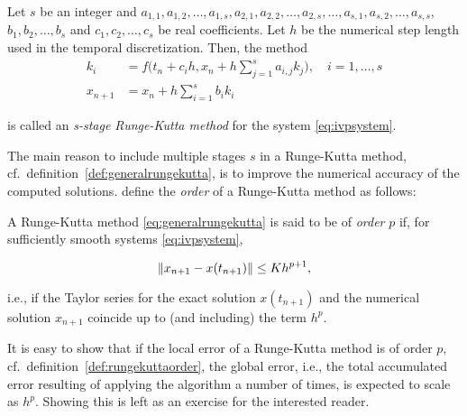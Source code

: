 \begin{Def}
    \label{def:generalrungekutta}
    Let $s$ be an integer and $a_{1,1},a_{1,2},\ldots,a_{1,s},a_{2,1},
    a_{2,2},\ldots,a_{2,s},\ldots,a_{s,1},a_{s,2},\ldots,a_{s,s}$,
    $b_{1},b_{2},\ldots,b_{s}$ and $c_{1},c_{2},\ldots,c_{s}$ be real
    coefficients. Let $h$ be the numerical step length used in the
    temporal discretization. Then, the method
\begin{equation}
    \label{eq:generalrungekutta}
    \begin{aligned}
        k_{i} &= f\bigg(t_{n}+c_{i}h,x_{n}+
                h\sum\limits_{j=1}^{s}a_{i,j}k_{j}\bigg),\quad{}i=1,\ldots,s\\
        x_{n+1} &= x_{n} + h\sum\limits_{i=1}^{s}b_{i}k_{i}
    \end{aligned}
\end{equation}

is called an \emph{s-stage Runge-Kutta method} for the system
\eqref{eq:ivpsystem}.
\end{Def}

The main reason to include multiple stages $s$ in a Runge-Kutta method, cf.\
definition~\ref{def:generalrungekutta}, is to improve the numerical accuracy
of the computed solutions.
\textcite[p.2 in the 2010 printing]{hairer1993solving} define the \emph{order}
of a Runge-Kutta method as follows:\\

\begin{Def}
    \label{def:rungekuttaorder}
    A Runge-Kutta method \eqref{eq:generalrungekutta} is said to be of
    \emph{order} $p$ if, for sufficiently smooth systems \eqref{eq:ivpsystem},

    \begin{equation}
        \label{eq:rungekuttaorder}
        \norm{x_{n+1}-x(t_{n+1})} \leq Kh^{p+1},
    \end{equation}

    i.e., if the Taylor series for the exact solution $x(t_{n+1})$ and the
    numerical solution $x_{n+1}$ coincide up to (and including) the term $h^p$.
\end{Def}

It is easy to show that if the local error of a Runge-Kutta method is of order
$p$, cf.\ definition~\ref{def:rungekuttaorder}, the global error, i.e., the
total accumulated error resulting of applying the algorithm a number of times,
is expected to scale as $h^{p}$. Showing this is left as an exercise for the
interested reader.

